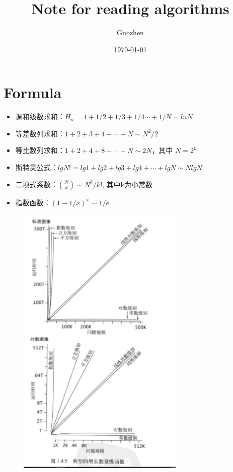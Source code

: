 \message{ !name(Algorithms.tex)}\documentclass{article}
\begin{document}

\title{ Note for reading algorithms }
\author{Guozhen}
\date{\today}
\maketitle

\section{Formula}
\label{sec:Formula}

\begin{itemize}
\item 调和级数求和：$H_n=1+1/2+1/3+1/4 \cdots +1/N \sim lnN$
\item 等差数列求和：$1+2+3+4+ \cdots +N \sim N^2/2$
\item 等比数列求和：$1+2+4+8+ \cdots +N \sim 2N$，其中 $N=2^n$
\item 斯特灵公式：$lgN!=lg1+lg2+lg3+lg4+ \cdots +lgN \sim NlgN$
\item 二项式系数：$\binom{N}{k} \sim N^k/k!$, 其中k为小常数
\item 指数函数：$(1-1/x)^x \sim 1/e$
\end{itemize}

\begin{figure}
  \centering
  \includegraphics[width=8cm]{chart}
\end{figure}
\end{document}
